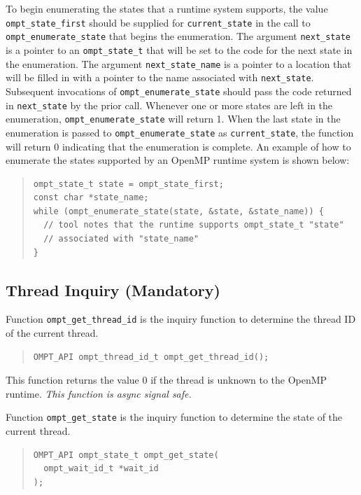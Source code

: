\documentclass{article}
\begin{document}
\noindent
To begin enumerating the states that a runtime system supports,
the value \verb|ompt_state_first| should be supplied for \verb|current_state| in the call to \verb|ompt_enumerate_state| that begins the enumeration.
The argument \verb|next_state| is a pointer to an \verb|ompt_state_t| that will be set to the code for the next state in the enumeration.
The argument \verb|next_state_name| is a pointer to a location that will be filled in with a pointer to the name associated with \verb|next_state|. 
Subsequent invocations of \verb|ompt_enumerate_state| should pass the code returned in \verb|next_state| by the prior call.
Whenever one or more states are left in the enumeration, \verb|ompt_enumerate_state| will return 1.
When the last state in the enumeration is passed to \verb|ompt_enumerate_state| as \verb|current_state|, the function will return 0 indicating that the enumeration is complete.
An example of how to enumerate the states supported by an OpenMP runtime system is shown below:

\begin{quote}
\begin{verbatim}
ompt_state_t state = ompt_state_first;
const char *state_name;
while (ompt_enumerate_state(state, &state, &state_name)) {
  // tool notes that the runtime supports ompt_state_t "state" 
  // associated with "state_name" 
}
\end{verbatim}
\end{quote}


\subsection{Thread Inquiry (Mandatory)}
\label{sec:thread-inquiry}

Function \verb|ompt_get_thread_id| is the inquiry function to determine the thread ID of the 
current thread.

\begin{quote}
\begin{verbatim}
OMPT_API ompt_thread_id_t ompt_get_thread_id();
\end{verbatim}
\end{quote}
 
 \noindent
This function returns the value 0 if the thread is unknown to the OpenMP runtime.  {\em This function is async signal safe.}
 
Function \verb|ompt_get_state| is the inquiry function to determine the state of the 
current thread.

\begin{quote}
\begin{verbatim}
OMPT_API ompt_state_t ompt_get_state(
  ompt_wait_id_t *wait_id       
);
\end{verbatim}
\end{quote}
 
\end{document}
